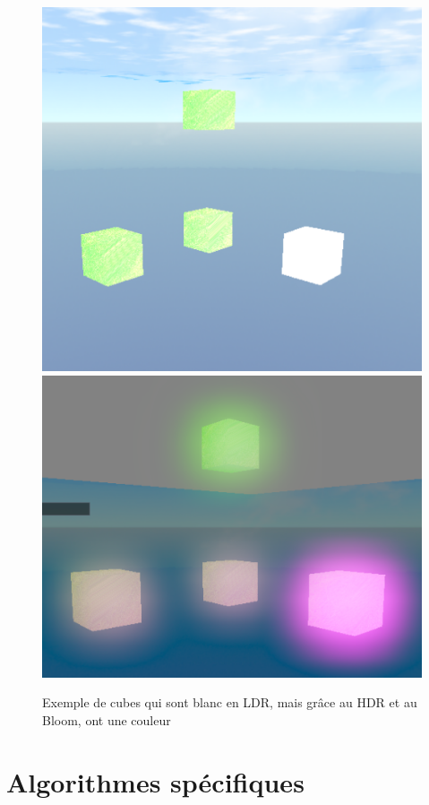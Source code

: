 \documentclass{EPUProjetDi}
\begin{document}
\begin{figure}[H]
	\centering
	\includegraphics[scale=.4]{before_bloom}
	\includegraphics[scale=.47]{after_bloom}
	\caption{Exemple de cubes qui sont blanc en LDR, mais grâce au HDR et au Bloom, ont une couleur}
	\label{fig:bloom_comp_fig}
\end{figure}



\chapter{Algorithmes spécifiques}
\end{document}
